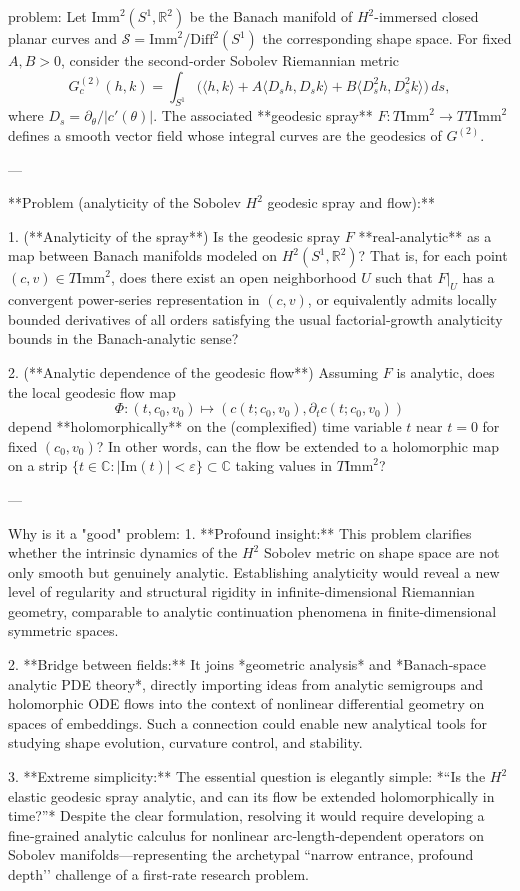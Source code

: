 problem:  
Let \(\mathrm{Imm}^{2}(S^{1},\mathbb{R}^{2})\) be the Banach manifold of \(H^{2}\)-immersed closed planar curves and \(\mathcal{S} = \mathrm{Imm}^{2}/\mathrm{Diff}^{2}(S^{1})\) the corresponding shape space.  
For fixed \(A,B>0\), consider the second‑order Sobolev Riemannian metric  
\[
G^{(2)}_c(h,k)=\int_{S^{1}}\big(\langle h,k\rangle + A\langle D_s h, D_s k\rangle + B\langle D_s^{2}h, D_s^{2}k\rangle\big)\,ds,
\]
where \(D_s = \partial_{\theta}/|c'(\theta)|\).  
The associated **geodesic spray** \(F:T\mathrm{Imm}^{2}\to TT\mathrm{Imm}^{2}\) defines a smooth vector field whose integral curves are the geodesics of \(G^{(2)}\).

---

**Problem (analyticity of the Sobolev \(H^{2}\) geodesic spray and flow):**

1. (**Analyticity of the spray**)  
   Is the geodesic spray \(F\) **real‑analytic** as a map between Banach manifolds modeled on \(H^{2}(S^{1},\mathbb{R}^{2})\)?  
   That is, for each point \((c,v)\in T\mathrm{Imm}^{2}\), does there exist an open neighborhood \(U\) such that \(F|_U\) has a convergent power‑series representation in \((c,v)\), or equivalently admits locally bounded derivatives of all orders satisfying the usual factorial‑growth analyticity bounds in the Banach‑analytic sense?

2. (**Analytic dependence of the geodesic flow**)  
   Assuming \(F\) is analytic, does the local geodesic flow map
   \[
   \Phi:(t,c_0,v_0)\mapsto (c(t;c_0,v_0),\partial_t c(t;c_0,v_0))
   \]
   depend **holomorphically** on the (complexified) time variable \(t\) near \(t=0\) for fixed \((c_0,v_0)\)?  
   In other words, can the flow be extended to a holomorphic map on a strip \(\{t\in\mathbb{C}:|\mathrm{Im}(t)|<\varepsilon\}\subset\mathbb{C}\) taking values in \(T\mathrm{Imm}^{2}\)?

---

Why is it a "good" problem:  
1. **Profound insight:**  
   This problem clarifies whether the intrinsic dynamics of the \(H^{2}\) Sobolev metric on shape space are not only smooth but genuinely analytic. Establishing analyticity would reveal a new level of regularity and structural rigidity in infinite‑dimensional Riemannian geometry, comparable to analytic continuation phenomena in finite‑dimensional symmetric spaces.  

2. **Bridge between fields:**  
   It joins *geometric analysis* and *Banach‑space analytic PDE theory*, directly importing ideas from analytic semigroups and holomorphic ODE flows into the context of nonlinear differential geometry on spaces of embeddings. Such a connection could enable new analytical tools for studying shape evolution, curvature control, and stability.  

3. **Extreme simplicity:**  
   The essential question is elegantly simple:  
   *“Is the \(H^{2}\) elastic geodesic spray analytic, and can its flow be extended holomorphically in time?”*  
   Despite the clear formulation, resolving it would require developing a fine‑grained analytic calculus for nonlinear arc‑length‑dependent operators on Sobolev manifolds—representing the archetypal “narrow entrance, profound depth’’ challenge of a first‑rate research problem.